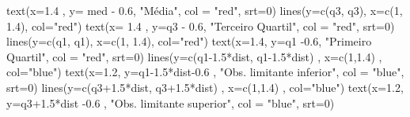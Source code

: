 \documentclass[
]{book}
\newenvironment{Shaded}{\begin{snugshade}}{\end{snugshade}}
\newcommand{\AttributeTok}[1]{\textcolor[rgb]{0.77,0.63,0.00}{#1}}
\newcommand{\DecValTok}[1]{\textcolor[rgb]{0.00,0.00,0.81}{#1}}
\newcommand{\FloatTok}[1]{\textcolor[rgb]{0.00,0.00,0.81}{#1}}
\newcommand{\FunctionTok}[1]{\textcolor[rgb]{0.00,0.00,0.00}{#1}}
\newcommand{\NormalTok}[1]{#1}
\newcommand{\SpecialCharTok}[1]{\textcolor[rgb]{0.00,0.00,0.00}{#1}}
\newcommand{\StringTok}[1]{\textcolor[rgb]{0.31,0.60,0.02}{#1}}
\begin{document}
\begin{Shaded}
\begin{Highlighting}[]
\FunctionTok{text}\NormalTok{(}\AttributeTok{x=}\FloatTok{1.4}\NormalTok{ , }\AttributeTok{y=}\NormalTok{ med }\SpecialCharTok{{-}} \FloatTok{0.6}\NormalTok{, }\StringTok{"Média"}\NormalTok{, }\AttributeTok{col =} \StringTok{"red"}\NormalTok{, }\AttributeTok{srt=}\DecValTok{0}\NormalTok{)}
\FunctionTok{lines}\NormalTok{(}\AttributeTok{y=}\FunctionTok{c}\NormalTok{(q3, q3), }\AttributeTok{x=}\FunctionTok{c}\NormalTok{(}\DecValTok{1}\NormalTok{, }\FloatTok{1.4}\NormalTok{), }\AttributeTok{col=}\StringTok{"red"}\NormalTok{) }
\FunctionTok{text}\NormalTok{(}\AttributeTok{x=} \FloatTok{1.4}\NormalTok{ , }\AttributeTok{y=}\NormalTok{q3 }\SpecialCharTok{{-}} \FloatTok{0.6}\NormalTok{, }\StringTok{"Terceiro Quartil"}\NormalTok{, }\AttributeTok{col =} \StringTok{"red"}\NormalTok{, }\AttributeTok{srt=}\DecValTok{0}\NormalTok{)}
\FunctionTok{lines}\NormalTok{(}\AttributeTok{y=}\FunctionTok{c}\NormalTok{(q1, q1), }\AttributeTok{x=}\FunctionTok{c}\NormalTok{(}\DecValTok{1}\NormalTok{, }\FloatTok{1.4}\NormalTok{), }\AttributeTok{col=}\StringTok{"red"}\NormalTok{) }
\FunctionTok{text}\NormalTok{(}\AttributeTok{x=}\FloatTok{1.4}\NormalTok{, }\AttributeTok{y=}\NormalTok{q1 }\SpecialCharTok{{-}}\FloatTok{0.6}\NormalTok{, }\StringTok{"Primeiro Quartil"}\NormalTok{, }\AttributeTok{col =} \StringTok{"red"}\NormalTok{, }\AttributeTok{srt=}\DecValTok{0}\NormalTok{)}
\FunctionTok{lines}\NormalTok{(}\AttributeTok{y=}\FunctionTok{c}\NormalTok{(q1}\FloatTok{{-}1.5}\SpecialCharTok{*}\NormalTok{dist, q1}\FloatTok{{-}1.5}\SpecialCharTok{*}\NormalTok{dist) , }\AttributeTok{x=}\FunctionTok{c}\NormalTok{(}\DecValTok{1}\NormalTok{,}\FloatTok{1.4}\NormalTok{) , }\AttributeTok{col=}\StringTok{"blue"}\NormalTok{) }
\FunctionTok{text}\NormalTok{(}\AttributeTok{x=}\FloatTok{1.2}\NormalTok{, }\AttributeTok{y=}\NormalTok{q1}\FloatTok{{-}1.5}\SpecialCharTok{*}\NormalTok{dist}\FloatTok{{-}0.6}\NormalTok{ , }\StringTok{"Obs. limitante inferior"}\NormalTok{, }\AttributeTok{col =} \StringTok{"blue"}\NormalTok{, }\AttributeTok{srt=}\DecValTok{0}\NormalTok{)}
\FunctionTok{lines}\NormalTok{(}\AttributeTok{y=}\FunctionTok{c}\NormalTok{(q3}\FloatTok{+1.5}\SpecialCharTok{*}\NormalTok{dist, q3}\FloatTok{+1.5}\SpecialCharTok{*}\NormalTok{dist) , }\AttributeTok{x=}\FunctionTok{c}\NormalTok{(}\DecValTok{1}\NormalTok{,}\FloatTok{1.4}\NormalTok{) , }\AttributeTok{col=}\StringTok{"blue"}\NormalTok{) }
\FunctionTok{text}\NormalTok{(}\AttributeTok{x=}\FloatTok{1.2}\NormalTok{, }\AttributeTok{y=}\NormalTok{q3}\FloatTok{+1.5}\SpecialCharTok{*}\NormalTok{dist }\SpecialCharTok{{-}}\FloatTok{0.6}\NormalTok{ , }\StringTok{"Obs. limitante superior"}\NormalTok{, }\AttributeTok{col =} \StringTok{"blue"}\NormalTok{, }\AttributeTok{srt=}\DecValTok{0}\NormalTok{)}
\end{Highlighting}
\end{Shaded}
\end{document}

